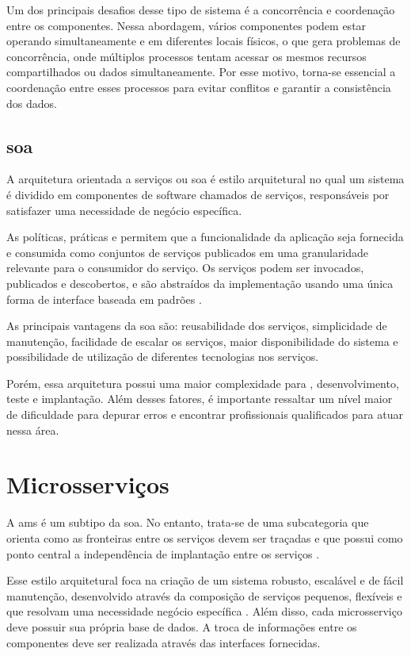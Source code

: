 Um dos principais desafios desse tipo de sistema é a concorrência e coordenação entre os componentes. Nessa abordagem, vários componentes podem estar operando simultaneamente e em diferentes locais físicos, o que gera problemas de concorrência, onde múltiplos processos tentam acessar os mesmos recursos compartilhados ou dados simultaneamente. Por esse motivo, torna-se essencial a coordenação entre esses processos para evitar conflitos e garantir a consistência dos dados.

\subsection{{\acrfull{soa}}} 
A arquitetura orientada a serviços ou \acrfull{soa} é estilo arquitetural no qual um sistema é dividido em componentes de software chamados de serviços, responsáveis por satisfazer uma necessidade de negócio específica.

As políticas, práticas e  permitem que a funcionalidade da aplicação seja fornecida e consumida como conjuntos de serviços publicados em uma granularidade relevante para o consumidor do serviço. Os serviços podem ser invocados, publicados e descobertos, e são abstraídos da implementação usando uma única forma de interface baseada em padrões \cite{understandingSOA}.

As principais vantagens da \acrshort{soa} são: reusabilidade dos serviços, simplicidade de manutenção, facilidade de escalar os serviços, maior disponibilidade do sistema e possibilidade de utilização de diferentes tecnologias nos serviços.

Porém, essa arquitetura possui uma maior complexidade para , desenvolvimento, teste e implantação. Além desses fatores, é importante ressaltar um nível maior de dificuldade para depurar erros e encontrar profissionais qualificados para atuar nessa área.

\section{Microsserviços} 
A \acrfull{ams} é um subtipo da \acrshort{soa}. No entanto, trata-se de uma subcategoria que orienta como as fronteiras entre os serviços devem ser traçadas e que possui como ponto central a independência de implantação entre os serviços \cite{buildingMicroservices}.

Esse estilo arquitetural foca na criação de um sistema robusto, escalável e de fácil manutenção, desenvolvido através da composição de serviços pequenos, flexíveis e que resolvam uma necessidade negócio específica \cite{buildingMicroservices}. Além disso, cada microsserviço deve possuir sua própria base de dados. A troca de informações entre os componentes deve ser realizada através das interfaces fornecidas.

